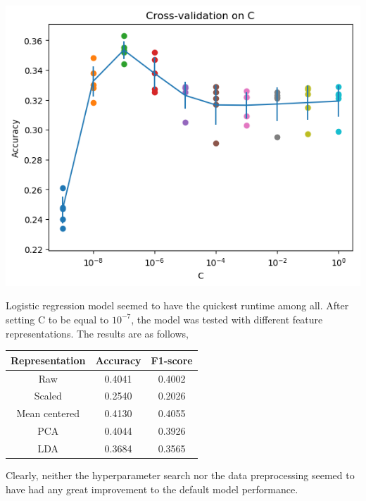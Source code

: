 \documentclass[12pt]{article}
\begin{document}
\begin{center}
\includegraphics[scale=0.6]{lreg-c.png}
\end{center}

Logistic regression model seemed to have the quickest runtime among all. After setting C to be equal to $10^{-7}$, the model was tested with different feature representations. The results are as follows,

\begin{center}
  \begin{tabular}{|c|c|c|}
    \hline
    Representation & Accuracy & F1-score \\
    \hline
    Raw & 0.4041 & 0.4002\\
    Scaled & 0.2540 & 0.2026 \\
    Mean centered & 0.4130 & 0.4055\\
    PCA & 0.4044 & 0.3926\\
    LDA & 0.3684 & 0.3565 \\
    \hline
  \end{tabular}
\end{center}

Clearly, neither the hyperparameter search nor the data preprocessing seemed to have had any great improvement to the default model performance.
\end{document}
